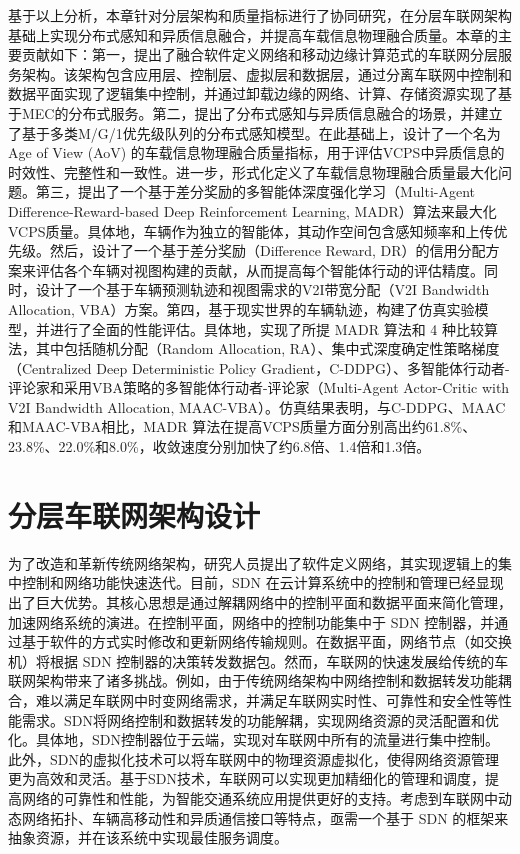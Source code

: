 基于以上分析，本章针对分层架构和质量指标进行了协同研究，在分层车联网架构基础上实现分布式感知和异质信息融合，并提高车载信息物理融合质量。本章的主要贡献如下：第一，提出了融合软件定义网络和移动边缘计算范式的车联网分层服务架构。该架构包含应用层、控制层、虚拟层和数据层，通过分离车联网中控制和数据平面实现了逻辑集中控制，并通过卸载边缘的网络、计算、存储资源实现了基于MEC的分布式服务。第二，提出了分布式感知与异质信息融合的场景，并建立了基于多类M/G/1优先级队列的分布式感知模型。在此基础上，设计了一个名为Age of View (AoV) 的车载信息物理融合质量指标，用于评估VCPS中异质信息的时效性、完整性和一致性。进一步，形式化定义了车载信息物理融合质量最大化问题。第三，提出了一个基于差分奖励的多智能体深度强化学习（Multi-Agent Difference-Reward-based Deep Reinforcement Learning, MADR）算法来最大化VCPS质量。具体地，车辆作为独立的智能体，其动作空间包含感知频率和上传优先级。然后，设计了一个基于差分奖励（Difference Reward, DR）的信用分配方案来评估各个车辆对视图构建的贡献，从而提高每个智能体行动的评估精度。同时，设计了一个基于车辆预测轨迹和视图需求的V2I带宽分配（V2I Bandwidth Allocation, VBA）方案。第四，基于现实世界的车辆轨迹，构建了仿真实验模型，并进行了全面的性能评估。具体地，实现了所提 MADR 算法和 4 种比较算法，其中包括随机分配（Random Allocation, RA）、集中式深度确定性策略梯度（Centralized Deep Deterministic Policy Gradient，C-DDPG）\cite{mlika2022deep}、多智能体行动者-评论家\cite{he2021efficient}和采用VBA策略的多智能体行动者-评论家（Multi-Agent Actor-Critic with V2I Bandwidth Allocation, MAAC-VBA）。仿真结果表明，与C-DDPG、MAAC和MAAC-VBA相比，MADR 算法在提高VCPS质量方面分别高出约61.8\%、23.8\%、22.0\%和8.0\%，收敛速度分别加快了约6.8倍、1.4倍和1.3倍。

\section{分层车联网架构设计}\label{section 2-2}

为了改造和革新传统网络架构，研究人员提出了软件定义网络\cite{wang2020ji}，其实现逻辑上的集中控制和网络功能快速迭代。目前，SDN 在云计算系统中的控制和管理已经显现出了巨大优势\cite{jain2013network}。其核心思想是通过解耦网络中的控制平面和数据平面来简化管理，加速网络系统的演进。在控制平面，网络中的控制功能集中于 SDN 控制器，并通过基于软件的方式实时修改和更新网络传输规则。在数据平面，网络节点（如交换机）将根据 SDN 控制器的决策转发数据包。然而，车联网的快速发展给传统的车联网架构带来了诸多挑战。例如，由于传统网络架构中网络控制和数据转发功能耦合，难以满足车联网中时变网络需求，并满足车联网实时性、可靠性和安全性等性能需求。SDN将网络控制和数据转发的功能解耦，实现网络资源的灵活配置和优化。具体地，SDN控制器位于云端，实现对车联网中所有的流量进行集中控制。此外，SDN的虚拟化技术可以将车联网中的物理资源虚拟化，使得网络资源管理更为高效和灵活。基于SDN技术，车联网可以实现更加精细化的管理和调度，提高网络的可靠性和性能，为智能交通系统应用提供更好的支持。考虑到车联网中动态网络拓扑、车辆高移动性和异质通信接口等特点，亟需一个基于 SDN 的框架来抽象资源，并在该系统中实现最佳服务调度。

